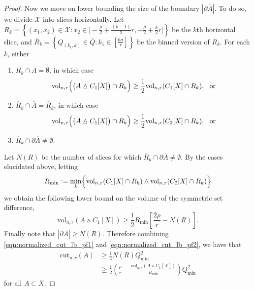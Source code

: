 \documentclass[11pt,twoside]{article}
\newcommand{\set}[1]{\left\{#1\right\}}
\newcommand{\vol}{\mathrm{vol}}
\newcommand{\cut}{\mathrm{cut}}
\newcommand{\abs}[1]{\left \lvert #1 \right \rvert}
\newcommand{\1}{\mathbf{1}}
\newcommand{\Xbf}{X}             %
\begin{document}
\begin{proof}
	Now we move on lower bounding the size of the boundary $\abs{\partial\overline{A}}$. To do so, we divide $\mathcal{X}$ into slices horizontally. Let $R_k = \set{(x_1,x_2) \in \mathcal{X}: x_2 \in \bigl[-\frac{\rho}{2} + \frac{(k - 1)}{2}r, -\frac{\rho}{2} + \frac{k}{2}r\bigr]}$ be the $k$th horizontal slice, and $\overline{R}_k = \set{Q_{(k_1,k)} \in \overline{Q}:k_1 \in [\frac{6\sigma}{r}]}$ be the binned version of $R_k$. For each $k$, either
	\begin{enumerate}
		\item $\overline{R}_k \cap \overline{A} = \emptyset$, in which case
		\begin{equation*}
		\vol_{n,r}\Bigl( \bigl(A \vartriangle C_1[\Xbf]\bigr) \cap R_k \Bigr) \geq \frac{1}{2}\vol_{n,r}(C_1[\Xbf] \cap R_k), ~~ \textrm{or}
		\end{equation*}
		\item $\overline{R}_k \cap \overline{A} = \overline{R}_k$, in which case
		\begin{equation*}
		\vol_{n,r}\Bigl( \bigl(A \vartriangle C_1[\Xbf]\bigr) \cap R_k \Bigr) \geq \frac{1}{2}\vol_{n,r}(C_2[\Xbf] \cap R_k), ~~\textrm{or}
		\end{equation*}
		\item $\overline{R}_k \cap \partial \overline{A} \neq \emptyset$.
	\end{enumerate}
	Let $N(R)$ be the number of slices for which $\overline{R}_k \cap \partial \overline{A} \neq \emptyset$. By the cases elucidated above, letting
	\begin{equation*} R_{\min} := \min_{k}\Bigl\{\vol_{n,r}(C_1[\Xbf] \cap R_k) \wedge \vol_{n,r}(C_2[\Xbf] \cap R_k)\Bigr\}
	\end{equation*} 
	we obtain the following lower bound on the volume of the symmetric set difference,
	\begin{equation}
	\label{eqn:normalized_cut_lb_pf2}
	\vol_{n,r}(A \vartriangle C_1[\Xbf]) \geq \frac{1}{2} R_{\min}  \left[\frac{2\rho}{r} - N(R)\right].
	\end{equation}
	Finally note that $\abs{\partial\overline{A}} \geq N(R)$. Therefore combining \eqref{eqn:normalized_cut_lb_pf1} and \eqref{eqn:normalized_cut_lb_pf2}, we have that
	\begin{align}
	\cut_{n,r}(A) & \geq \frac{1}{4}N(R) Q_{\min}^2 \nonumber \\
	& \geq \frac{1}{2}\left(\frac{\rho}{r} - \frac{\vol_{n,r}(A \vartriangle C_1[\Xbf])}{R_{\min}}\right) Q_{\min}^2 \label{eqn:normalized_cut_lb_pf3}
	\end{align}
	for all $A \subset \Xbf$.
	

\end{proof}
\end{document}
